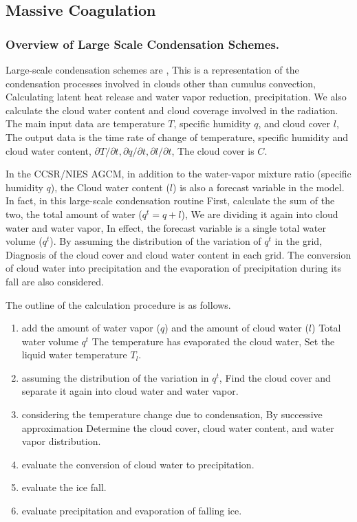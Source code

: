 \hypertarget{massive-coagulation}{%
\subsection{Massive Coagulation}\label{massive-coagulation}}

\hypertarget{overview-of-large-scale-condensation-schemes.}{%
\subsubsection{Overview of Large Scale Condensation
Schemes.}\label{overview-of-large-scale-condensation-schemes.}}

Large-scale condensation schemes are , This is a representation of the
condensation processes involved in clouds other than cumulus convection,
Calculating latent heat release and water vapor reduction,
precipitation. We also calculate the cloud water content and cloud
coverage involved in the radiation. The main input data are temperature
\(T\), specific humidity \(q\), and cloud cover \(l\), The output data
is the time rate of change of temperature, specific humidity and cloud
water content,
\(\partial T/\partial t, \partial q/\partial t, \partial l/\partial t\),
The cloud cover is \(C\).

In the CCSR/NIES AGCM, in addition to the water-vapor mixture ratio
(specific humidity \(q\)), the Cloud water content (\(l\)) is also a
forecast variable in the model. In fact, in this large-scale
condensation routine First, calculate the sum of the two, the total
amount of water (\(q^t = q+l\)), We are dividing it again into cloud
water and water vapor, In effect, the forecast variable is a single
total water volume (\(q^t\)). By assuming the distribution of the
variation of \(q^t\) in the grid, Diagnosis of the cloud cover and cloud
water content in each grid. The conversion of cloud water into
precipitation and the evaporation of precipitation during its fall are
also considered.

The outline of the calculation procedure is as follows.

\begin{enumerate}
\def\labelenumi{\arabic{enumi}.}
\item
  add the amount of water vapor (\(q\)) and the amount of cloud water
  (\(l\)) Total water volume \(q^t\) The temperature has evaporated the
  cloud water, Set the liquid water temperature \(T_l\).
\item
  assuming the distribution of the variation in \(q^t\), Find the cloud
  cover and separate it again into cloud water and water vapor.
\item
  considering the temperature change due to condensation, By successive
  approximation Determine the cloud cover, cloud water content, and
  water vapor distribution.
\item
  evaluate the conversion of cloud water to precipitation.
\item
  evaluate the ice fall.
\item
  evaluate precipitation and evaporation of falling ice.
\end{enumerate}

